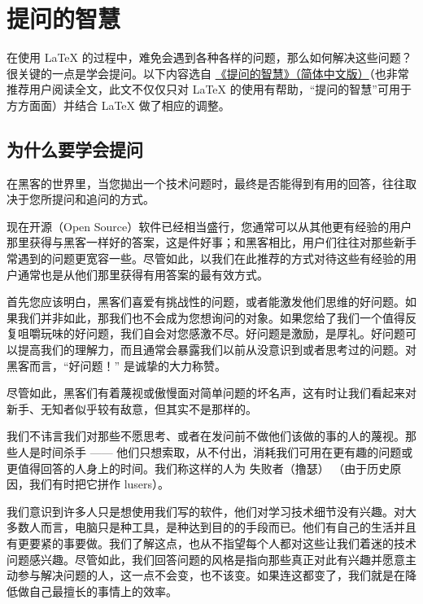 
\section{提问的智慧}

在使用 \LaTeX{} 的过程中，难免会遇到各种各样的问题，那么如何解决这些问题？很关键的一点是学会提问。以下内容选自 \href{https://github.com/ryanhanwu/How-To-Ask-Questions-The-Smart-Way/blob/main/README-zh_CN.md}{《提问的智慧》（简体中文版）}（也非常推荐用户阅读全文，此文不仅仅只对 \LaTeX{} 的使用有帮助，“提问的智慧”可用于方方面面）并结合 \LaTeX{} 做了相应的调整。


\subsection{为什么要学会提问}

在黑客的世界里，当您拋出一个技术问题时，最终是否能得到有用的回答，往往取决于您所提问和追问的方式。

现在开源（Open Source）软件已经相当盛行，您通常可以从其他更有经验的用户那里获得与黑客一样好的答案，这是件好事；和黑客相比，用户们往往对那些新手常遇到的问题更宽容一些。尽管如此，以我们在此推荐的方式对待这些有经验的用户通常也是从他们那里获得有用答案的最有效方式。

首先您应该明白，黑客们喜爱有挑战性的问题，或者能激发他们思维的好问题。如果我们并非如此，那我们也不会成为您想询问的对象。如果您给了我们一个值得反复咀嚼玩味的好问题，我们自会对您感激不尽。好问题是激励，是厚礼。好问题可以提高我们的理解力，而且通常会暴露我们以前从没意识到或者思考过的问题。对黑客而言，“好问题！” 是诚挚的大力称赞。

尽管如此，黑客们有着蔑视或傲慢面对简单问题的坏名声，这有时让我们看起来对新手、无知者似乎较有敌意，但其实不是那样的。

我们不讳言我们对那些不愿思考、或者在发问前不做他们该做的事的人的蔑视。那些人是时间杀手 —— 他们只想索取，从不付出，消耗我们可用在更有趣的问题或更值得回答的人身上的时间。我们称这样的人为 失败者（撸瑟） （由于历史原因，我们有时把它拼作 lusers）。

我们意识到许多人只是想使用我们写的软件，他们对学习技术细节没有兴趣。对大多数人而言，电脑只是种工具，是种达到目的的手段而已。他们有自己的生活并且有更要紧的事要做。我们了解这点，也从不指望每个人都对这些让我们着迷的技术问题感兴趣。尽管如此，我们回答问题的风格是指向那些真正对此有兴趣并愿意主动参与解决问题的人，这一点不会变，也不该变。如果连这都变了，我们就是在降低做自己最擅长的事情上的效率。


